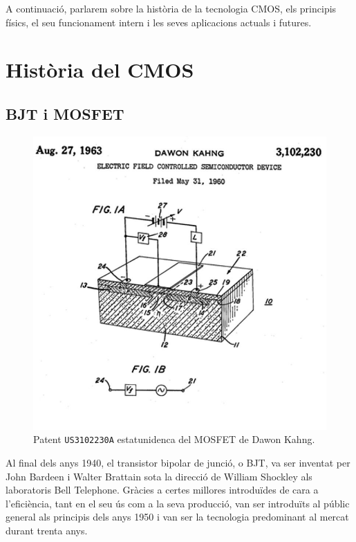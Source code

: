 \documentclass[11pt,a4paper]{article}
\begin{document}
A continuació, parlarem sobre la història de la tecnologia CMOS, els principis físics, el seu funcionament intern i les seves aplicacions actuals i futures.



\section{Història del CMOS}

\subsection{BJT i MOSFET}

\begin{figure}
    \centering
    \includegraphics[width=\linewidth]{images/patent kahang.jpg}
    \caption{Patent \texttt{US3102230A} estatunidenca del MOSFET de Dawon Kahng.}
\end{figure}
Al final dels anys 1940, el transistor bipolar de junció, o BJT, va ser inventat per John Bardeen i Walter Brattain sota la direcció de William Shockley als laboratoris Bell Telephone. Gràcies a certes millores introduïdes de cara a l'eficiència, tant en el seu ús com a la seva producció, van ser introduïts al públic general als principis dels anys 1950 i van ser la tecnologia predominant al mercat durant trenta anys.
\end{document}
